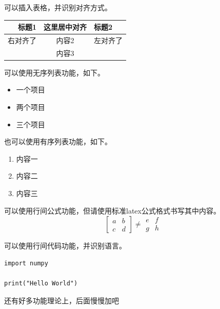 \documentclass{ctexart} %
\begin{document}
\par 可以插入表格，并识别对齐方式。

\begin{table}[ht]
    \centering
    \begin{tabular}{rcl}
        \toprule
        \textbf{标题1}&\textbf{这里居中对齐}&\textbf{标题2} \\
        \midrule
          右对齐了  &     内容2      &  左对齐了   \\
                    &     内容3      &             \\
        \bottomrule
    \end{tabular}
\end{table}

\par 可以使用无序列表功能，如下。

\begin{itemize}
    \item 一个项目
    \item 两个项目
    \item 三个项目

\end{itemize}
\par 也可以使用有序列表功能，如下。

\begin{enumerate}
    \item 内容一
    \item 内容二
    \item 内容三

\end{enumerate}
\par 可以使用行间公式功能，但请使用标准latex公式格式书写其中内容。
\begin{equation}
\begin{bmatrix}
a & b \\ c & d
\end{bmatrix}
\neq
\begin{matrix}
e & f \\ g & h
\end{matrix}
\end{equation}
\par 可以使用行间代码功能，并识别语言。

\begin{verbatim}
import numpy

print("Hello World")
\end{verbatim}

\par 还有好多功能理论上，后面慢慢加吧




\clearpage

\end{document}
